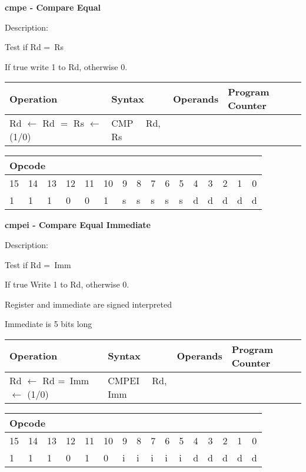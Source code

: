 \documentclass{article}
\begin{document}
\bigskip

\textbf{cmpe - Compare Equal}

Description:

Test if Rd =\ Rs

If true write 1 to Rd, otherwise 0.

\begin{tabular}{|l|l|l|l|}
\hline
Operation & Syntax & Operands & Program Counter \\ \hline
Rd $\leftarrow $ Rd $=$ Rs $\leftarrow $ (1/0) & CMP \ \ Rd, Rs &  &  \\ 
\hline
\end{tabular}

\begin{tabular}{|c|c|c|c|c|c|c|c|c|c|c|c|c|c|c|c|}
\hline
\multicolumn{6}{|l|}{Opcode} & \multicolumn{5}{|l|}{} & \multicolumn{5}{|l|}{
} \\ \hline
15 & 14 & 13 & 12 & 11 & 10 & 9 & 8 & 7 & 6 & 5 & 4 & 3 & 2 & 1 & 0 \\ \hline
\multicolumn{1}{|l|}{1} & \multicolumn{1}{|l|}{1} & \multicolumn{1}{|l|}{1}
& \multicolumn{1}{|l|}{0} & \multicolumn{1}{|l|}{0} & \multicolumn{1}{|l|}{1}
& \multicolumn{1}{|l|}{s} & \multicolumn{1}{|l|}{s} & \multicolumn{1}{|l|}{s}
& \multicolumn{1}{|l|}{s} & \multicolumn{1}{|l|}{s} & \multicolumn{1}{|l|}{d}
& \multicolumn{1}{|l|}{d} & \multicolumn{1}{|l|}{d} & \multicolumn{1}{|l|}{d}
& \multicolumn{1}{|l|}{d} \\ \hline
\end{tabular}

\bigskip

\textbf{cmpei - Compare Equal Immediate}

Description:

Test if Rd =\ Imm

If true Write 1 to Rd, otherwise 0.

Register and immediate are signed interpreted

Immediate is 5 bits long

\begin{tabular}{|l|l|l|l|}
\hline
Operation & Syntax & Operands & Program Counter \\ \hline
Rd $\leftarrow $ Rd =\ Imm $\leftarrow $ (1/0) & CMPEI \ \ Rd, Imm &  &  \\ 
\hline
\end{tabular}

\begin{tabular}{|c|c|c|c|c|c|c|c|c|c|c|c|c|c|c|c|}
\hline
\multicolumn{6}{|l|}{Opcode} & \multicolumn{5}{|l|}{} & \multicolumn{5}{|l|}{
} \\ \hline
15 & 14 & 13 & 12 & 11 & 10 & 9 & 8 & 7 & 6 & 5 & 4 & 3 & 2 & 1 & 0 \\ \hline
\multicolumn{1}{|l|}{1} & \multicolumn{1}{|l|}{1} & \multicolumn{1}{|l|}{1}
& \multicolumn{1}{|l|}{0} & \multicolumn{1}{|l|}{1} & \multicolumn{1}{|l|}{0}
& \multicolumn{1}{|l|}{i} & \multicolumn{1}{|l|}{i} & \multicolumn{1}{|l|}{i}
& \multicolumn{1}{|l|}{i} & \multicolumn{1}{|l|}{i} & \multicolumn{1}{|l|}{d}
& \multicolumn{1}{|l|}{d} & \multicolumn{1}{|l|}{d} & \multicolumn{1}{|l|}{d}
& \multicolumn{1}{|l|}{d} \\ \hline
\end{tabular}
\end{document}
